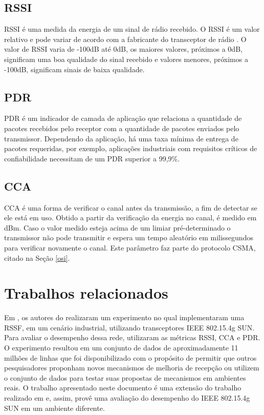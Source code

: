 \subsection{RSSI}
RSSI é uma medida da energia de um sinal de rádio recebido. O RSSI é um valor relativo e pode variar de acordo com a fabricante do transceptor de rádio \cite{UNDERSTANDING_RSSI}. O valor de RSSI varia de -100dB até 0dB, os maiores valores, próximos a 0dB, significam uma boa qualidade do sinal recebido e valores menores, próximos a -100dB, significam sinais de baixa qualidade.

\subsection{PDR}
PDR é um indicador de camada de aplicação que relaciona a quantidade de pacotes recebidos pelo receptor com a quantidade de pacotes enviados pelo transmissor. Dependendo da aplicação, há uma taxa mínima de entrega de pacotes requeridas, por exemplo, aplicações industriais com requisitos críticos de confiabilidade necessitam de um PDR superior a 99,9\%.

\subsection{CCA}
CCA é uma forma de verificar o canal antes da transmissão, a fim de detectar se ele está em uso. Obtido a partir da verificação da energia no canal, é medido em dBm. Caso o valor medido esteja acima de um limiar pré-determinado o transmissor não pode transmitir e espera um tempo aleatório em milissegundos para verificar novamente o canal. Este parâmetro faz parte do protocolo CSMA, citado na Seção \ref{osi}.

\section{Trabalhos relacionados}
Em \cite{tuset2020dataset}, os autores do realizaram um experimento no qual implementaram uma RSSF, em um cenário industrial, utilizando transceptores IEEE 802.15.4g SUN. Para avaliar o desempenho dessa rede, utilizaram as métricas RSSI, CCA e PDR. O experimento resultou em um conjunto de dados de aproximadamente 11 milhões de linhas que foi disponibilizado com o propósito de permitir que outros pesquisadores proponham novos mecanismos de melhoria de recepção ou utilizem o conjunto de dados para testar suas propostas de mecanismos em ambientes reais. O trabalho apresentado neste documento é uma extensão do trabalho realizado em \cite{tuset2020dataset} e, assim, provê uma avaliação do desempenho do IEEE 802.15.4g SUN em um ambiente diferente.

